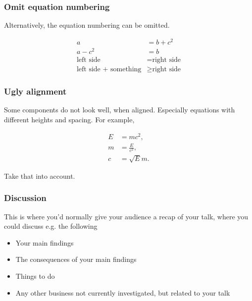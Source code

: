 \documentclass{beamer}
\begin{document}
\begin{frame}
    \frametitle{Omit equation numbering}
    Alternatively, the equation numbering can be omitted. %
    
    \begin{align*} 
    a &= b + c^2 \\ 
    a - c^2 &= b \\ 
    \text{left side} &= \text{right side} \\ 
    \text{left side + something} &\geq \text{right side}
    \end{align*}
\end{frame}


\begin{frame}
    \frametitle{Ugly alignment}
    Some components do not look well, when aligned. Especially equations with different
heights and spacing. For example,

    \begin{align} 
    E &= mc^2, \\ 
    m &= \frac{E}{c^2}, \\ 
    c &= \sqrt{E}{m}. 
    \end{align} 

    Take that into account.
\end{frame}

\begin{frame}
    \frametitle{Discussion}
    This is where you’d normally give your audience a recap of your talk, where you could
discuss e.g. the following
\begin{itemize}
    \item Your main findings
    \item The consequences of your main findings
    \item Things to do
    \item Any other business not currently investigated, but related to your talk
\end{itemize}
\end{frame}
\end{document}
